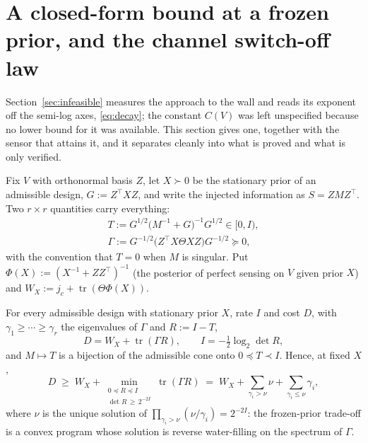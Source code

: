 
\section{A closed-form bound at a frozen prior, and the channel switch-off law}
\label{sec:waterfill}

Section~\ref{sec:infeasible} measures the approach to the wall and reads its
exponent off the semi-log axes, \eqref{eq:decay}; the constant $C(V)$ was left
unspecified because no lower bound for it was available. This section gives one,
together with the sensor that attains it, and it separates cleanly into what is
proved and what is only verified.

Fix $V$ with orthonormal basis $Z$, let $X\succ0$ be the stationary prior of an
admissible design, $G:=Z^{\top}XZ$, and write the injected information as
$S=ZMZ^{\top}$. Two $r\times r$ quantities carry everything:
\begin{equation}
 \begin{gathered}
 T:=G^{1/2}\big(M^{-1}+G\big)^{-1}G^{1/2}\in[0,I),\\
 \Gamma:=G^{-1/2}\big(Z^{\top}X\Theta XZ\big)G^{-1/2}\succeq0,
 \end{gathered}
\label{eq:TG}
\end{equation}
with the convention that $T=0$ when $M$ is singular. Put
$\Phi(X):=(X^{-1}+ZZ^{\top})^{-1}$ (the posterior of perfect sensing on $V$ given
prior $X$) and $W_X:=j_c+\operatorname{tr}(\Theta\Phi(X))$.

\begin{proposition}
\label{pr:freeze}
For every admissible design with stationary prior $X$, rate $I$ and cost $D$,
with $\gamma_1\ge\cdots\ge\gamma_r$ the eigenvalues of $\Gamma$ and $R:=I-T$,
\begin{equation}
 D=W_X+\operatorname{tr}(\Gamma R),\qquad
 I=-\tfrac12\log_2\det R,
\label{eq:red}
\end{equation}
and $M\mapsto T$ is a bijection of the admissible cone onto $0\preceq T\prec I$.
Hence, at fixed $X$,
\begin{equation}
 D\;\ge\;W_X+\min_{\substack{0\preceq R\preceq I\\ \det R\,\ge\,2^{-2I}}}
 \operatorname{tr}(\Gamma R)
 \;=\;W_X+\sum_{\gamma_i>\nu}\nu+\sum_{\gamma_i\le\nu}\gamma_i,
\label{eq:wf}
\end{equation}
where $\nu$ is the unique solution of $\prod_{\gamma_i>\nu}(\nu/\gamma_i)=2^{-2I}$:
the frozen-prior trade-off is a convex program whose solution is reverse
water-filling on the spectrum of $\Gamma$.
\end{proposition}

